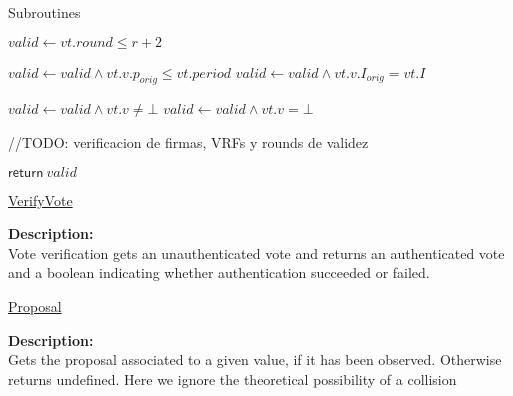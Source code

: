 \documentclass[10pt,a4paper]{article}
\begin{document}
\begin{section}{Subroutines}
\begin{algorithm}[H]\label{algo:verify-vote}
    \begin{algorithmic}[1]
        \State $valid \gets vt.round \leq r+2$
        
            \State $valid \gets valid \land vt.v.p_{orig} \leq vt.period$
                \State $valid \gets valid \land vt.v.I_{orig} = vt.I$
            \EndIf
        \EndIf
        
            \State $valid \gets valid \land vt.v \neq \bot$
            \State $valid \gets valid \land vt.v = \bot$
        \EndIf


        //TODO: verificacion de firmas, VRFs y rounds de validez

        \State $\mathsf{return} \ valid$
    \EndFunction
    \end{algorithmic}
    \caption{\underline{VerifyVote}}
\end{algorithm}

\noindent \textbf{Description:}\\
Vote verification gets an unauthenticated vote and returns an authenticated vote and a
boolean indicating whether authentication succeeded or failed.



\begin{algorithm}[H]
    \begin{algorithmic}[1]

        
    \EndIf

    \EndFunction
    \end{algorithmic}
    \caption{\underline{Proposal}}
\end{algorithm}

\noindent \textbf{Description:}\\ Gets the proposal associated to a given value, if it has been observed.
Otherwise returns undefined. Here we ignore the theoretical possibility of a collision



\end{section}
\end{document}
